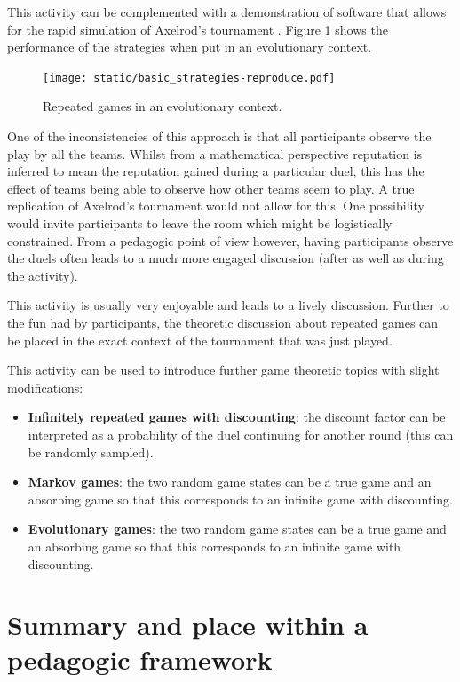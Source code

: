 \documentclass{article}
\begin{document}
This activity can be complemented with a demonstration of software that allows
for the rapid simulation of Axelrod's tournament
\cite{Axelrod-Pythonprojectteam2015}. Figure \ref{fig:evolutionary_axelrod}
shows the performance of the strategies when put in an evolutionary context.

\begin{figure}[!hbtp]
    \centering
    \texttt{[image: static/basic\_strategies-reproduce.pdf]}
    \caption{Repeated games in an evolutionary context.}
    \label{fig:evolutionary_axelrod}
\end{figure}

One of the inconsistencies of this approach is that all participants observe the
play by all the teams. Whilst from a mathematical perspective reputation is
inferred to mean the reputation gained during a particular duel, this has the
effect of teams being able to observe how other teams seem to play. A true
replication of Axelrod's tournament would not allow for this. One possibility
would invite participants to leave the room which might be logistically
constrained. From a pedagogic point of view however, having participants observe
the duels often leads to a much more engaged discussion (after as well as during
the activity).

This activity is usually very enjoyable and leads to a lively discussion.
Further to the fun had by participants, the theoretic discussion about repeated
games can be placed in the exact context of the tournament that was just played.

This activity can be used to introduce further game theoretic topics with
slight modifications:

\begin{itemize}
    \item \textbf{Infinitely repeated games with discounting}: the discount
        factor can be interpreted as a probability of the duel continuing for
        another round (this can be randomly sampled).
    \item \textbf{Markov games}: the two random game states can be a true game
        and an absorbing game so that this corresponds to an infinite game with
        discounting.
    \item \textbf{Evolutionary games}: the two random game states can be a true game
        and an absorbing game so that this corresponds to an infinite game with
        discounting.
\end{itemize}

\section{Summary and place within a pedagogic framework}\label{sec:summary}
\end{document}
